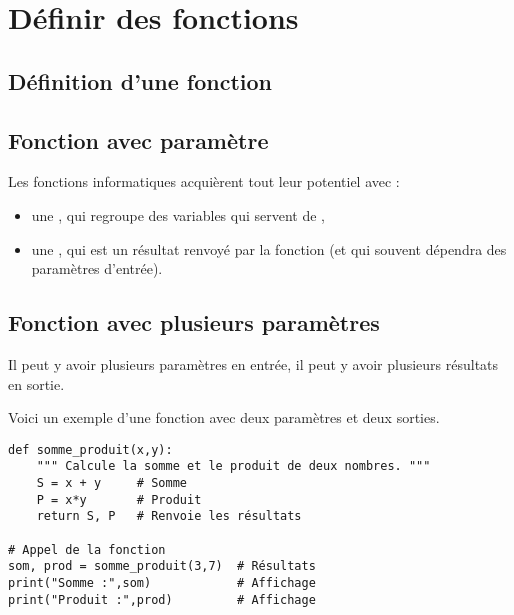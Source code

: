 \documentclass[11pt,class=report,crop=false]{standalone}
\begin{document}
\section{Définir des fonctions}

\subsection{Définition d'une fonction}


\subsection{Fonction avec paramètre}

Les fonctions informatiques acquièrent tout leur potentiel avec :
\begin{itemize}
  \item une , qui regroupe des variables qui servent de ,
  \item une , qui est un résultat renvoyé par la fonction (et qui souvent dépendra des paramètres d'entrée).
\end{itemize}




\subsection{Fonction avec plusieurs paramètres}

Il peut y avoir plusieurs paramètres en entrée, il peut y avoir plusieurs résultats en sortie.
  


Voici un exemple d'une fonction avec deux paramètres et deux sorties.
\begin{lstlisting}
def somme_produit(x,y):
    """ Calcule la somme et le produit de deux nombres. """
    S = x + y     # Somme
    P = x*y       # Produit
    return S, P   # Renvoie les résultats

# Appel de la fonction
som, prod = somme_produit(3,7)  # Résultats
print("Somme :",som)            # Affichage
print("Produit :",prod)         # Affichage
\end{lstlisting}
\end{document}
